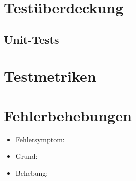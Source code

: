 \documentclass[a4paper]{scrreprt}
\begin{document}
    \chapter{Testüberdeckung}
      \section{Unit-Tests}




    \chapter{Testmetriken}




    \chapter{Fehlerbehebungen}

    \begin{itemize}
        \item Fehlersymptom:
        \item Grund:
        \item Behebung:
    \end{itemize}
\end{document}
